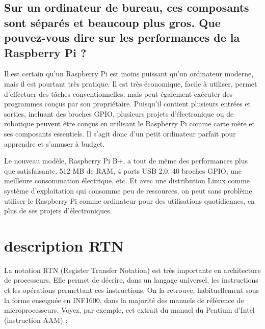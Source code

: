 \documentclass[10pt,letterpaper]{article}
\begin{document}
\subsection{Sur un ordinateur de bureau, ces composants sont séparés et beaucoup plus gros. Que pouvez-vous dire sur les performances de la Raspberry Pi ?}
Il est certain qu'un Raspberry Pi est moins puissant qu'un ordinateur moderne, mais il est pourtant très pratique. Il est très économique, facile à utiliser, permet d'effectuer des tâches conventionnelles, mais peut également exécuter des programmes conçus par son propriétaire. Puisqu'il contient plusieurs entrées et sorties, incluant des broches GPIO, plusieurs projets d'électronique ou de robotique peuvent être conçus en utilisant le Raspberry Pi comme carte mère et ses composants essentiels. Il s'agit donc d'un petit ordinateur parfait pour apprendre et s'amuser à budget.
\vspace{5mm}

\indent Le nouveau modèle, Raspberry Pi B+, a tout de même des performances plus que satisfaisante. 512 MB de RAM, 4 ports USB 2.0, 40 broches GPIO, une meilleure consommation électrique, etc. Et avec une distribution Linux comme système d'exploitation qui consomme peu de ressources, on peut sans problème utiliser le Raspberry Pi comme ordinateur pour des utilisations quotidiennes, en plus de ses projets d'électroniques.

\newpage
\section{description RTN}
La notation RTN (Register Transfer Notation) est très importante en architecture de processeurs. Elle permet de décrire, dans un langage universel, les instructions et les opérations permettant ces instructions. On la retrouve, habituellement sous la forme enseignée en INF1600, dans la majorité des manuels de référence de microprocesseurs. Voyez, par exemple, cet extrait du manuel du Pentium d'Intel (instruction AAM) :

\noindent
{}
\bigskip
\end{document}
